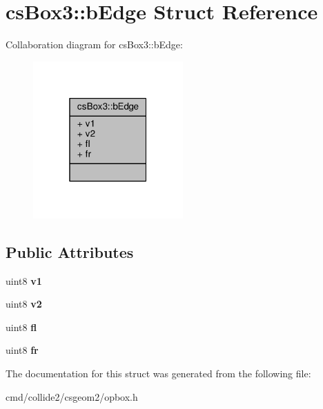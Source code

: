 \hypertarget{structcsBox3_1_1bEdge}{}\section{cs\+Box3\+:\+:b\+Edge Struct Reference}
\label{structcsBox3_1_1bEdge}


Collaboration diagram for cs\+Box3\+:\+:b\+Edge\+:
\nopagebreak
\begin{figure}[H]
\begin{center}
\leavevmode
\includegraphics[width=163pt]{d8/db7/structcsBox3_1_1bEdge__coll__graph}
\end{center}
\end{figure}
\subsection*{Public Attributes}
\begin{DoxyCompactItemize}
\item 
uint8 {\bfseries v1}\hypertarget{structcsBox3_1_1bEdge_aafcdb017fc37fe5d440da616e9a389c4}{}\label{structcsBox3_1_1bEdge_aafcdb017fc37fe5d440da616e9a389c4}

\item 
uint8 {\bfseries v2}\hypertarget{structcsBox3_1_1bEdge_ad116802ebee10bb0d637c120824faaec}{}\label{structcsBox3_1_1bEdge_ad116802ebee10bb0d637c120824faaec}

\item 
uint8 {\bfseries fl}\hypertarget{structcsBox3_1_1bEdge_a8c7ffb43361eddf33ee3c8006c546a0e}{}\label{structcsBox3_1_1bEdge_a8c7ffb43361eddf33ee3c8006c546a0e}

\item 
uint8 {\bfseries fr}\hypertarget{structcsBox3_1_1bEdge_a76936eee3dbcaa3e00b318e0c7878d93}{}\label{structcsBox3_1_1bEdge_a76936eee3dbcaa3e00b318e0c7878d93}

\end{DoxyCompactItemize}


The documentation for this struct was generated from the following file\+:\begin{DoxyCompactItemize}
\item 
cmd/collide2/csgeom2/opbox.\+h\end{DoxyCompactItemize}
